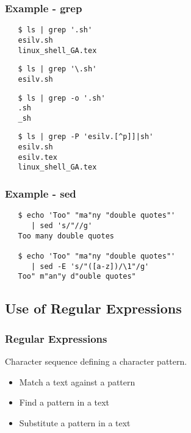 \begin{frame}[fragile]\frametitle{Example - grep}
   \small
   \begin{verbatim}
   $ ls | grep '.sh'
   esilv.sh
   linux_shell_GA.tex
   \end{verbatim}

   \begin{verbatim}
   $ ls | grep '\.sh'
   esilv.sh
   \end{verbatim}

   \begin{verbatim}
   $ ls | grep -o '.sh'
   .sh
   _sh
   \end{verbatim}

   \begin{verbatim}
   $ ls | grep -P 'esilv.[^p]]|sh'
   esilv.sh
   esilv.tex
   linux_shell_GA.tex
   \end{verbatim}

\end{frame}

\begin{frame}[fragile]
   \frametitle{Example - sed}
   \begin{verbatim}
   $ echo 'Too" "ma"ny "double quotes"'
      | sed 's/"//g'
   Too many double quotes

   $ echo 'Too" "ma"ny "double quotes"'
      | sed -E 's/"([a-z])/\1"/g'
   Too" m"an"y d"ouble quotes"
   \end{verbatim}
\end{frame}

\subsection{Use of Regular Expressions}

\begin{frame}[fragile]
   \frametitle{Regular Expressions}
   Character sequence defining a character pattern.
   \begin{itemize}
      \item Match a text against a pattern
      \item Find a pattern in a text
      \item Substitute a pattern in a text
   \end{itemize}
\end{frame}


